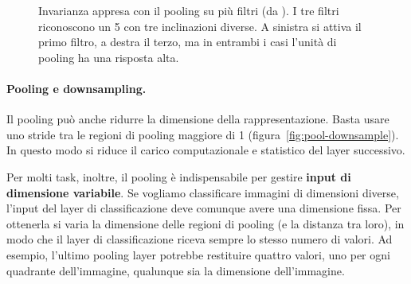 \begin{figure}[htbp]
\centering
{}
\caption{Invarianza appresa con il pooling su più filtri (da \cite{Goodfellow-et-al-2016}). I tre filtri riconoscono un 5 con tre inclinazioni diverse. A sinistra si attiva il primo filtro, a destra il terzo, ma in entrambi i casi l'unità di pooling ha una risposta alta.}
\label{fig:pool-invarianza}
\end{figure}

\paragraph{Pooling e downsampling.}
Il pooling può anche ridurre la dimensione della rappresentazione. Basta usare uno stride tra le regioni di pooling maggiore di 1 (figura~\ref{fig:pool-downsample}). In questo modo si riduce il carico computazionale e statistico del layer successivo.

Per molti task, inoltre, il pooling è indispensabile per gestire \textbf{input di dimensione variabile}. Se vogliamo classificare immagini di dimensioni diverse, l'input del layer di classificazione deve comunque avere una dimensione fissa. Per ottenerla si varia la dimensione delle regioni di pooling (e la distanza tra loro), in modo che il layer di classificazione riceva sempre lo stesso numero di valori. Ad esempio, l'ultimo pooling layer potrebbe restituire quattro valori, uno per ogni quadrante dell'immagine, qualunque sia la dimensione dell'immagine.

